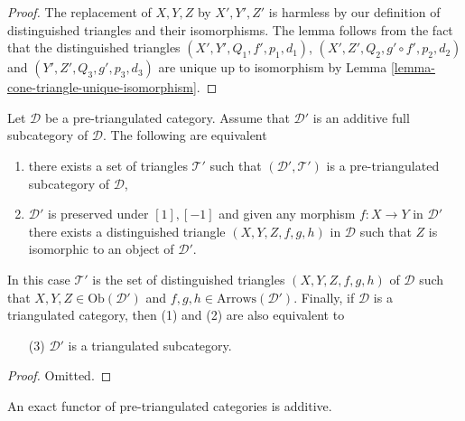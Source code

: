 \begin{proof}
The replacement of $X, Y, Z$ by $X', Y', Z'$ is harmless by our
definition of distinguished triangles and their isomorphisms.
The lemma follows from the fact that the distinguished triangles
$(X', Y', Q_1, f', p_1, d_1)$,
$(X', Z', Q_2, g' \circ f', p_2, d_2)$
and
$(Y', Z', Q_3, g', p_3, d_3)$
are unique up to isomorphism by
Lemma \ref{lemma-cone-triangle-unique-isomorphism}.
\end{proof}

\begin{lemma}
\label{lemma-triangulated-subcategory}
Let $\mathcal{D}$ be a pre-triangulated category.
Assume that $\mathcal{D}'$ is an additive full subcategory of $\mathcal{D}$.
The following are equivalent
\begin{enumerate}
\item there exists a set of triangles $\mathcal{T}'$ such that
$(\mathcal{D}', \mathcal{T}')$ is a pre-triangulated subcategory
of $\mathcal{D}$,
\item $\mathcal{D}'$ is preserved under $[1], [-1]$ and
given any morphism $f : X \to Y$ in $\mathcal{D}'$ there exists
a distinguished triangle $(X, Y, Z, f, g, h)$ in $\mathcal{D}$
such that $Z$ is isomorphic to an object of $\mathcal{D}'$.
\end{enumerate}
In this case $\mathcal{T}'$ is the set of distinguished triangles
$(X, Y, Z, f, g, h)$ of $\mathcal{D}$ such that
$X, Y, Z \in \text{Ob}(\mathcal{D}')$ and
$f, g, h \in \text{Arrows}(\mathcal{D}')$. Finally, if $\mathcal{D}$
is a triangulated category, then (1) and (2) are also equivalent to
\begin{enumerate}
\item[(3)] $\mathcal{D}'$ is a triangulated subcategory.
\end{enumerate}
\end{lemma}

\begin{proof}
Omitted.
\end{proof}

\begin{lemma}
\label{lemma-exact-functor-additive}
An exact functor of pre-triangulated categories is additive.
\end{lemma}

